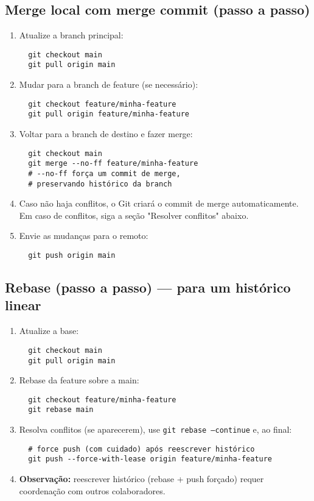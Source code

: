 \subsection{Merge local com merge commit (passo a passo)}
\begin{enumerate}
  \item Atualize a branch principal:
  \begin{verbatim}
  git checkout main
  git pull origin main
  \end{verbatim}
  \item Mudar para a branch de feature (se necessário):
  \begin{verbatim}
  git checkout feature/minha-feature
  git pull origin feature/minha-feature
  \end{verbatim}
  \item Voltar para a branch de destino e fazer merge:
  \begin{verbatim}
  git checkout main
  git merge --no-ff feature/minha-feature
  # --no-ff força um commit de merge,
  # preservando histórico da branch
  \end{verbatim}
  \item Caso não haja conflitos, o Git criará o commit de merge automaticamente. Em caso de conflitos, siga a seção "Resolver conflitos" abaixo.
  \item Envie as mudanças para o remoto:
  \begin{verbatim}
  git push origin main
  \end{verbatim}
\end{enumerate}

\subsection{Rebase (passo a passo) — para um histórico linear}
\begin{enumerate}
  \item Atualize a base:
  \begin{verbatim}
  git checkout main
  git pull origin main
  \end{verbatim}
  \item Rebase da feature sobre a main:
  \begin{verbatim}
  git checkout feature/minha-feature
  git rebase main
  \end{verbatim}
  \item Resolva conflitos (se aparecerem), use \texttt{git rebase --continue} e, ao final:
  \begin{verbatim}
  # force push (com cuidado) após reescrever histórico
  git push --force-with-lease origin feature/minha-feature
  \end{verbatim}
  \item \textbf{Observação:} reescrever histórico (rebase + push forçado) requer coordenação com outros colaboradores.
\end{enumerate}

